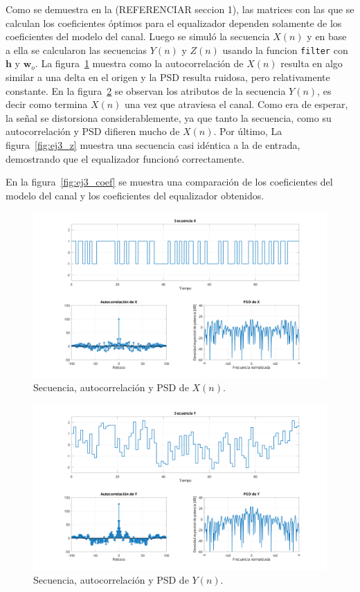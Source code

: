 Como se demuestra en la (REFERENCIAR seccion 1), las matrices con las que se calculan los coeficientes óptimos para el equalizador dependen solamente de los coeficientes del modelo del canal. Luego se simuló la secuencia $X(n)$ y en base a ella se calcularon las secuencias $Y(n)$ y $Z(n)$ usando la funcion \verb*|filter| con $\textbf{h}$ y $\textbf{w}_o$. La figura~\ref{fig:ej3_x} muestra como la autocorrelación de $X(n)$ resulta en algo similar a una delta en el origen y la PSD resulta ruidosa, pero relativamente constante. En la figura~\ref{fig:ej3_y} se observan los atributos de la secuencia $Y(n)$, es decir como termina $X(n)$ una vez que atraviesa el canal. Como era de esperar, la señal se distorsiona considerablemente, ya que tanto la secuencia, como su autocorrelación y PSD difieren mucho de $X(n)$. Por último, La figura~\ref{fig:ej3_z} muestra una secuencia casi idéntica a la de entrada, demostrando que el equalizador funcionó correctamente.

En la figura~\ref{fig:ej3_coef} se muestra una comparación de los coeficientes del modelo del canal y los coeficientes del equalizador obtenidos. 

\begin{figure}[h]
	\centering
	\includegraphics[width=1\linewidth]{img/ej3_x.pdf}
	\caption{Secuencia, autocorrelación y PSD de $X(n)$.}
	\label{fig:ej3_x}
\end{figure}

\begin{figure}[h]
	\centering
	\includegraphics[width=1\linewidth]{img/ej3_y.pdf}
	\caption{Secuencia, autocorrelación y PSD de $Y(n)$.}
	\label{fig:ej3_y}
\end{figure}

